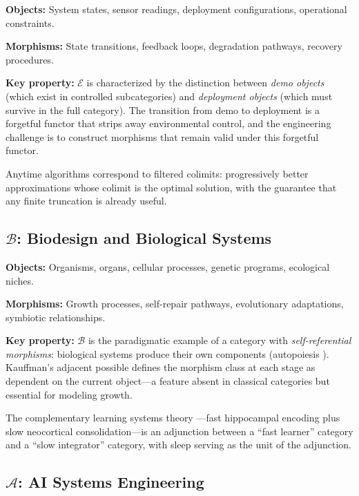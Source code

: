 \documentclass[11pt,a4paper]{article}
\begin{document}
\textbf{Objects:} System states, sensor readings, deployment configurations, operational constraints.

\textbf{Morphisms:} State transitions, feedback loops, degradation pathways, recovery procedures.

\textbf{Key property:} $\mathcal{E}$ is characterized by the distinction between \emph{demo objects} (which exist in controlled subcategories) and \emph{deployment objects} (which must survive in the full category). The transition from demo to deployment is a forgetful functor that strips away environmental control, and the engineering challenge is to construct morphisms that remain valid under this forgetful functor.

Anytime algorithms \citep{zilberstein1996using} correspond to filtered colimits: progressively better approximations whose colimit is the optimal solution, with the guarantee that any finite truncation is already useful.

\subsection{$\mathcal{B}$: Biodesign and Biological Systems}

\textbf{Objects:} Organisms, organs, cellular processes, genetic programs, ecological niches.

\textbf{Morphisms:} Growth processes, self-repair pathways, evolutionary adaptations, symbiotic relationships.

\textbf{Key property:} $\mathcal{B}$ is the paradigmatic example of a category with \emph{self-referential morphisms}: biological systems produce their own components (autopoiesis \citep{maturana1980autopoiesis}). Kauffman's adjacent possible \citep{kauffman2000investigations} defines the morphism class at each stage as dependent on the current object---a feature absent in classical categories but essential for modeling growth.

The complementary learning systems theory \citep{mcclelland1995complementary}---fast hippocampal encoding plus slow neocortical consolidation---is an adjunction between a ``fast learner'' category and a ``slow integrator'' category, with sleep serving as the unit of the adjunction.

\subsection{$\mathcal{A}$: AI Systems Engineering}
\end{document}
